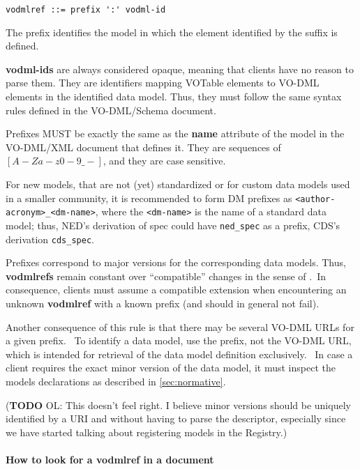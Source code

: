 \documentclass[11pt,a4paper]{ivoa}
\begin{document}
\begin{verbatim}
vodmlref ::= prefix ':' vodml-id
\end{verbatim}

The prefix identifies the model in which the element identified by the
suffix is defined.

\textbf{vodml-ids} are always considered opaque, meaning that clients
have no reason to parse them. They are identifiers mapping VOTable
elements to VO-DML elements in the identified data model. Thus, they
must follow the same syntax rules defined in the VO-DML/Schema document.

Prefixes MUST be exactly the same as the \textbf{name} attribute of the
model in the VO-DML/XML document that defines it. They are sequences of
$[A-Za-z0-9\_-]$, and they are case sensitive.

For new models, that are not (yet) standardized or for custom data
models used in a smaller community, it is recommended to form DM
prefixes as
\texttt{\textless{}author-acronym\textgreater{}\_\textless{}dm-name\textgreater{}},
where the \texttt{\textless{}dm-name\textgreater{}} is the name of a
standard data model; thus, NED's derivation of spec could have
\texttt{ned\_spec} as a prefix, CDS's derivation \texttt{cds\_spec}.

Prefixes correspond to major versions for the corresponding data models.
Thus, \textbf{vodmlrefs} remain constant over ``compatible'' changes in
the sense of \cite{2018ivoa.spec.0910L}.~In consequence, clients must assume a
compatible extension when encountering an unknown \textbf{vodmlref} with
a known prefix (and should in general not fail).

Another consequence of this rule is that there may be several VO-DML
URLs for a given prefix. ~To identify a data model, use the prefix, not
the VO-DML URL, which is intended for retrieval of the data model
definition exclusively. ~In case a client requires the exact minor
version of the data model, it must inspect the models declarations as
described in \ref{sec:normative}.

(\textbf{TODO} OL: This doesn't feel right. I believe minor versions
should be uniquely identified by a URI and without having to parse the
descriptor, especially since we have started talking about registering
models in the Registry.)

\paragraph{How to look for a vodmlref in a
document}\label{how-to-look-for-a-vodmlref-in-a-document}
\end{document}
